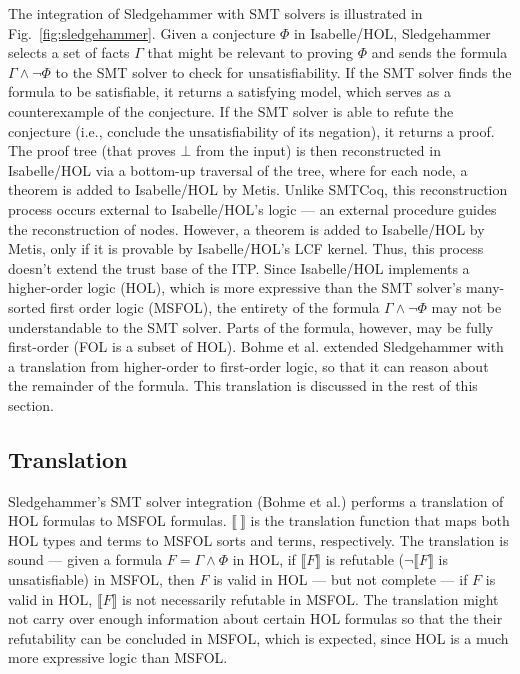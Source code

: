 \documentclass{article}
\begin{document}
	The integration of Sledgehammer 
	with SMT solvers is illustrated in 
	Fig.~\ref{fig:sledgehammer}. Given 
	a conjecture $\Phi$ in 
	Isabelle/HOL, Sledgehammer 
	selects a set of facts 
	$\Gamma$ that might be relevant 
	to proving $\Phi$ and sends
	the formula $\Gamma \land \neg 
	\Phi$ to the SMT solver to check 
	for unsatisfiability. If the SMT 
	solver finds the formula to be 
	satisfiable, it returns a satisfying 
	model, which serves as a 
	counterexample 
	of the conjecture. If the SMT 
	solver is able to refute the 
	conjecture (i.e., conclude 
	the unsatisfiability of its 
	negation), it returns 
	a proof. The proof tree (that
	proves $\bot$ from the 
	input) is then reconstructed in 
	Isabelle/HOL via a bottom-up 
	traversal of the tree, where 
	for each node, a theorem is 
	added to Isabelle/HOL by Metis.
	Unlike SMTCoq, this reconstruction
	process occurs external to 
	Isabelle/HOL's logic ---
	an external procedure guides 
	the reconstruction of nodes. 
	However, a theorem is added to 
	Isabelle/HOL by Metis, only if it 
	is provable by Isabelle/HOL's LCF 
	kernel. Thus, this process doesn't
	extend the trust base of the ITP.
	Since Isabelle/HOL 
	implements a higher-order logic 
	(HOL), which 
	is more expressive than 
	the SMT solver's many-sorted
	first order logic (MSFOL),
	the entirety of the formula
	$\Gamma \land \neg \Phi$ may not 
	be understandable to the SMT 
	solver. Parts of the formula,
	however, may be fully 
	first-order (FOL is 
	a subset of HOL). Bohme et al.
	extended Sledgehammer with 
	a translation from higher-order 
	to first-order logic, so that 
	it can reason about the remainder
	of the formula. This translation
	is discussed in the rest of this 
	section.
	
	\subsection{Translation}
	\label{sec:trans}
	Sledgehammer's SMT solver 
	integration (Bohme et al.) performs 
	a translation 
	of HOL formulas to MSFOL formulas.
	$\llbracket\ \rrbracket$
	is the translation function 
	that maps both HOL types and 
	terms to MSFOL sorts and terms,
	respectively.
	The translation is sound --- 
	given a formula 
	$F = \Gamma \land \Phi$ in HOL, if 
	$\llbracket F \rrbracket$ is refutable 
	($\neg \llbracket F \rrbracket$
	is unsatisfiable) in MSFOL, then 
	$F$	is valid in HOL --- but not 
	complete --- if $F$ is valid in 
	HOL, $\llbracket F \rrbracket$ is 
	not necessarily refutable in MSFOL. 
	The translation might not carry over 
	enough information about certain HOL 
	formulas so that the their 
	refutability can be concluded in 
	MSFOL, which is	expected, since HOL 
	is a much more expressive logic than 
	MSFOL. 
	
\end{document}
